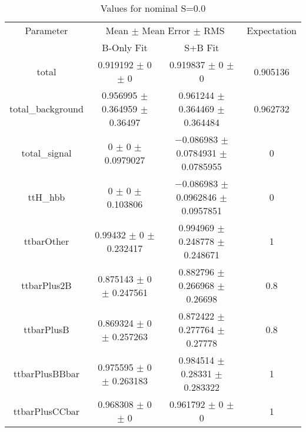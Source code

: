 \begin{table}
\centering
\caption{Values for nominal S=0.0}
\begin{tabular}{cccc}
\toprule
Parameter & \multicolumn{2}{c}{Mean $\pm$ Mean Error $\pm$ RMS} & Expectation\\
 & B-Only Fit & S+B Fit & \\
\midrule
total & \num{0.919192} $\pm$ \num{0} $\pm$ \num{0} & \num{0.919837} $\pm$ \num{0} $\pm$ \num{0} & \num{0.905136}\\
total\_background & \num{0.956995} $\pm$ \num{0.364959} $\pm$ \num{0.36497} & \num{0.961244} $\pm$ \num{0.364469} $\pm$ \num{0.364484} & \num{0.962732}\\
total\_signal & \num{0} $\pm$ \num{0} $\pm$ \num{0.0979027} & \num{-0.086983} $\pm$ \num{0.0784931} $\pm$ \num{0.0785955} & \num{0}\\
ttH\_hbb & \num{0} $\pm$ \num{0} $\pm$ \num{0.103806} & \num{-0.086983} $\pm$ \num{0.0962846} $\pm$ \num{0.0957851} & \num{0}\\
ttbarOther & \num{0.99432} $\pm$ \num{0} $\pm$ \num{0.232417} & \num{0.994969} $\pm$ \num{0.248778} $\pm$ \num{0.248671} & \num{1}\\
ttbarPlus2B & \num{0.875143} $\pm$ \num{0} $\pm$ \num{0.247561} & \num{0.882796} $\pm$ \num{0.266968} $\pm$ \num{0.26698} & \num{0.8}\\
ttbarPlusB & \num{0.869324} $\pm$ \num{0} $\pm$ \num{0.257263} & \num{0.872422} $\pm$ \num{0.277764} $\pm$ \num{0.27778} & \num{0.8}\\
ttbarPlusBBbar & \num{0.975595} $\pm$ \num{0} $\pm$ \num{0.263183} & \num{0.984514} $\pm$ \num{0.28331} $\pm$ \num{0.283322} & \num{1}\\
ttbarPlusCCbar & \num{0.968308} $\pm$ \num{0} $\pm$ \num{0} & \num{0.961792} $\pm$ \num{0} $\pm$ \num{0} & \num{1}\\
\bottomrule
\end{tabular}
\end{table}